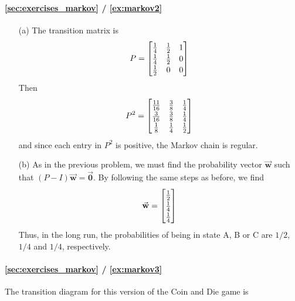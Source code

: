 \documentclass[reqno]{immbook}
\newcommand{\BW}{\vec{\textbf{w}}}
\newcommand{\BZ}{\vec{\textbf{0}}}  %
\newcommand{\T}{\rule{0pt}{2.6ex}}
\newcommand{\B}{\rule[-1.2ex]{0pt}{0pt}}
\begin{document}
\paragraph{\ref{sec:exercises_markov} / \ref{ex:markov2}}
\begin{enumerate}
\item[(a)] The transition matrix is
\[
  P = \begin{bmatrix}
           \frac{1}{4}  & \frac{1}{2} & 1 \T\B \\
	   \frac{1}{4}  & \frac{1}{2} & 0 \B \\
	   \frac{1}{2}  & 0   & 0 \B
      \end{bmatrix}
\]
Then
\[
  P^2 = \begin{bmatrix}
           \frac{11}{16}  & \frac{3}{8} & \frac{1}{4} \T\B \\
	   \frac{3}{16}  & \frac{3}{8} & \frac{1}{4} \B \\
	   \frac{1}{8}  & \frac{1}{4}   & \frac{1}{2} \B
      \end{bmatrix}
\]
and since each entry in $P^2$ is positive, the Markov chain
is regular.
\item[(b)]  As in the previous problem, we must find the probability
vector $\BW$ such that $(P-I)\BW=\BZ$.
By following the same steps as before, we find
\[
   \BW = \begin{bmatrix}
            \frac{1}{2} \T\B \\ \frac{1}{4} \B \\ \frac{1}{4} \B \\
         \end{bmatrix}
\]
Thus, in the long run, the probabilities of being in state A, B or C
are $1/2$, $1/4$ and $1/4$, respectively.
\end{enumerate}

\paragraph{\ref{sec:exercises_markov} / \ref{ex:markov3}}
The transition diagram for this version of the Coin and Die game is
\end{document}
